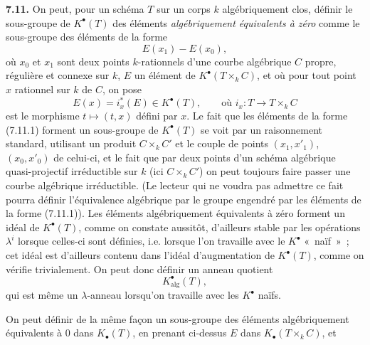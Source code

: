 
\textbf{7.11.} On peut, pour un schéma \(T\) sur un corps \(k\) algébriquement clos, définir le sous-groupe de \(K^\bullet(T)\) des éléments \emph{algébriquement équivalents à zéro} comme le sous-groupe des éléments de la forme
\begin{equation}\tag{7.11.1}
  E(x_1)-E(x_0),
\end{equation}
où \(x_0\) et \(x_1\) sont deux points \(k\)-rationnels d'une courbe algébrique \(C\) propre, régulière et connexe sur \(k\), \(E\) un élément de \(K^\bullet(T\times_k C)\), et où pour tout point \(x\) rationnel sur \(k\) de \(C\), on pose
\[
  E(x)=i_x^*(E)\in K^\bullet(T),\qquad\text{où }
  i_x:T\longrightarrow T\times_k C
\]
est le morphisme \(t\mapsto(t,x)\) défini par \(x\). Le fait que les éléments de la forme (7.11.1) forment un sous-groupe de \(K^\bullet(T)\) se voit par un raisonnement standard, utilisant un produit \(C\times_k C'\) et le couple de points \((x_1,x'_1)\), \((x_0,x'_0)\) de celui-ci, et le fait que par deux points d'un schéma algébrique quasi-projectif irréductible sur \(k\) (ici \(C\times_k C'\)) on peut toujours faire passer une courbe algébrique irréductible. (Le lecteur qui ne voudra pas admettre ce fait pourra définir l'équivalence algébrique par le groupe engendré par les éléments de la forme (7.11.1)). Les éléments algébriquement équivalents à zéro forment un idéal de \(K^\bullet(T)\), comme on constate aussitôt, d'ailleurs stable par les opérations \(\lambda^i\) lorsque celles-ci sont définies, i.e. lorsque l'on travaille avec le \(K^\bullet\) «~naïf~»~; cet idéal est d'ailleurs contenu dans l'idéal d'augmentation de \(K^\bullet(T)\), comme on vérifie trivialement. On peut donc définir un anneau quotient
\begin{equation}\tag{7.11.2}
  K^\bullet_{\mathrm{alg}}(T),
\end{equation}
qui est même un \(\lambda\)-anneau lorsqu'on travaille avec les \(K^\bullet\) naïfs.

On peut définir de la même façon un sous-groupe des éléments algébriquement équivalents à 0 dans \(K_\bullet(T)\), en prenant ci-dessus \(E\) dans \(K_\bullet(T\times_k C)\), et
